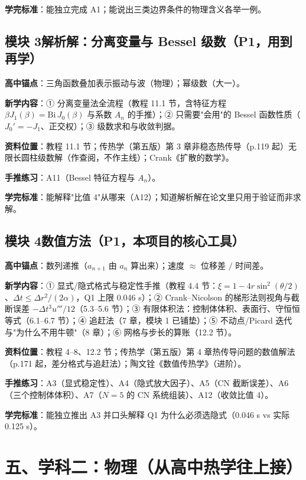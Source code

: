 \documentclass[12pt,a4paper]{ctexart}
\begin{document}
\textbf{学完标准}：能独立完成 A1；能说出三类边界条件的物理含义各举一例。

\subsection{模块 3\quad 解析解：分离变量与 Bessel 级数（P1，用到再学）}

\textbf{高中锚点}：三角函数叠加表示振动与波（物理）；幂级数（大一）。

\textbf{新学内容}：① 分离变量法全流程（教程 11.1 节，含特征方程 $\beta J_1(\beta)=\mathrm{Bi}\,J_0(\beta)$ 与系数 $A_n$ 的手推）；② 只需要"会用"的 Bessel 函数性质（$J_0'=-J_1$、正交权）；③ 级数求和与收敛判据。

\textbf{资料位置}：教程 11.1 节；传热学（第五版）第 3 章非稳态热传导（p.119 起）无限长圆柱级数解（作查阅，不作主线）；Crank《扩散的数学》。

\textbf{手推练习}：A11（Bessel 特征方程与 $A_n$）。

\textbf{学完标准}：能解释"比值 4"从哪来（A12）；知道解析解在论文里只用于验证而非求解。

\subsection{模块 4\quad 数值方法（P1，本项目的核心工具）}

\textbf{高中锚点}：数列递推（$a_{n+1}$ 由 $a_n$ 算出来）；速度 $\approx$ 位移差 $/$ 时间差。

\textbf{新学内容}：① 显式/隐式格式与稳定性手推（教程 4.4 节：$\xi=1-4r\sin^2(\theta/2)$、$\Delta t\le\Delta r^2/(2\alpha)$，Q1 上限 0.046 s）；② Crank--Nicolson 的梯形法则视角与截断误差 $-\Delta t^3u'''/12$（5.3--5.6 节）；③ 有限体积法：控制体体积、表面行、守恒恒等式（6.1--6.7 节）；④ 追赶法（7 章，模块 1 已铺垫）；⑤ 不动点/Picard 迭代与"为什么不用牛顿"（8 章）；⑥ 网格与步长的算账（12.2 节）。

\textbf{资料位置}：教程 4--8、12.2 节；传热学（第五版）第 4 章热传导问题的数值解法（p.171 起，差分格式与追赶法）；陶文铨《数值传热学》（进阶）。

\textbf{手推练习}：A3（显式稳定性）、A4（隐式放大因子）、A5（CN 截断误差）、A6（三个控制体体积）、A7（$N=5$ 的 CN 系统组装）、A12（收敛比值 4）。

\textbf{学完标准}：能独立推出 A3 并口头解释 Q1 为什么必须选隐式（0.046 s vs 实际 0.125 s）。

\section{五、学科二：物理（从高中热学往上接）}
\end{document}
